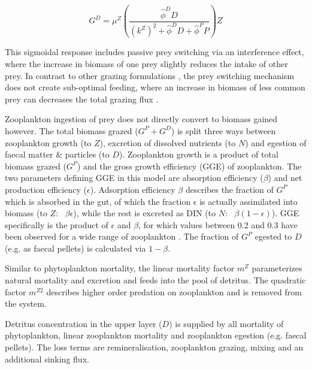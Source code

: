 \documentclass[journal abbreviation, manuscript]{copernicus}
\begin{document}
\begin{equation}
    G^D = \mu^Z \left( \frac{ \hat{\phi}^D D}{(k^Z)^2 + \hat{\phi}^D D +\hat{\phi}^P P}  \right) Z
\end{equation}

This sigmoidal response includes passive prey switching via an interference effect, where the increase in biomass of one prey slightly reduces the intake of other prey. In contrast to other grazing formulations \citep[e.g.][]{Fasham1990a}, the prey switching mechanism does not create sub-optimal feeding, where an increase in biomass of less common prey can decreases the total grazing flux \citep{Gentleman2003a}.

Zooplankton ingestion of prey does not directly convert to biomass gained however. The total biomass grazed ($G^P + G^D$) is split three ways between zooplankton growth (to $Z$), excretion of dissolved nutrients (to $N$) and egestion of faecal matter \& particles (to $D$). Zooplankton growth is a product of total biomass grazed ($G^P$) and the gross growth efficiency (GGE) of zooplankton. The two parameters defining GGE in this model are absorption efficiency ($\beta$) and net production efficiency ($\epsilon$). Adsorption efficiency $\beta$ describes the fraction of $G^P$ which is absorbed in the gut, of which the fraction $\epsilon$ is actually assimilated into biomass (to $Z$: \ $\beta \epsilon$), while the rest is excreted as DIN (to $N$: \ $\beta (1-\epsilon)$). GGE specifically is the product of $\epsilon$ and $\beta$, for which values between 0.2 and 0.3 have been observed for a wide range of zooplankton \citep{Straile1997GrossGroup}. The fraction of $G^P$ egested to $D$ (e.g. as faecal pellets) is calculated via $1-\beta$. 

Similar to phytoplankton mortality, the linear mortality factor $m^Z$ parameterizes natural mortality and excretion and feeds into the pool of detritus. The quadratic factor $m^{Z2}$ describes higher order predation on zooplankton and is removed from the system. 


Detritus concentration in the upper layer ($D$) is supplied by all mortality of phytoplankton, linear zooplankton mortality and zooplankton egestion (e.g. faecal pellets). The loss terms are remineralisation, zooplankton grazing, mixing and an additional sinking flux. 
\end{document}
